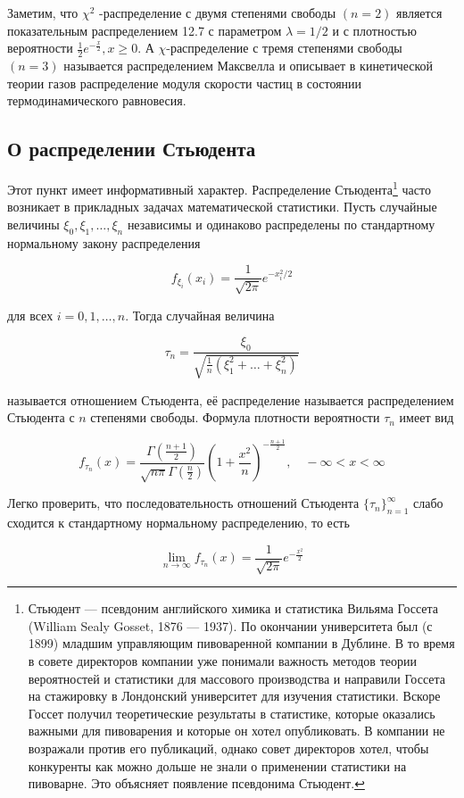  \begin{zam}
 \label{zam:27.7}
Заметим, что $\chi^2$ -распределение с двумя степенями
свободы $(n = 2)$ является показательным распределением 12.7 с параметром $\lambda = 1/2$ и с плотностью вероятности $\frac{1}{2}e^{-\frac{x}{2}}, x \geq 0$. А $\chi$-распределение с тремя степенями свободы $(n = 3)$ называется распределением Максвелла и описывает в кинетической теории газов распределение модуля скорости
частиц в состоянии термодинамического равновесия.
 \end{zam}

\subsection{О распределении Стьюдента}

\begin{zam}
\label{zam:27.8}
Этот пункт имеет информативный характер. Распределение Стьюдента\footnote{Стьюдент — псевдоним английского химика и статистика Вильяма Госсета (William Sealy Gosset, 1876
— 1937). По окончании университета был (с 1899) младшим управляющим пивоваренной компании в Дублине. В то время в совете директоров компании уже понимали важность методов
теории вероятностей и статистики для массового производства и направили Госсета на стажировку в
Лондонский университет для изучения статистики. Вскоре Госсет получил теоретические результаты в
статистике, которые оказались важными для пивоварения и которые он хотел опубликовать. В компании
не возражали против его публикаций, однако совет директоров хотел, чтобы конкуренты как можно
дольше не знали о применении статистики на пивоварне. Это объясняет появление псевдонима Стьюдент.} часто возникает в прикладных задачах математической статистики. Пусть случайные величины $\xi_0 , \xi_1 , \ldots , \xi_n$ независимы и одинаково распределены по стандартному нормальному закону распределения

$$f_{\xi_i} (x_i) = \frac{1}{\sqrt{2\pi}}e^{{-x^2_i/2}}$$

для всех $i = 0, 1, \ldots , n$. Тогда случайная величина

$$\tau_n = \frac{\xi_0}{\sqrt{\frac{1}{n}(\xi_1^2 + \ldots + \xi_n^2)}}$$

называется отношением Стьюдента, её распределение называется распределением Стьюдента с $n$ степенями свободы. Формула плотности вероятности $\tau_n$ имеет вид

$$f_{\tau_n}(x) = \frac{\Gamma(\frac{n+1}{2})}{\sqrt{n\pi}\Gamma(\frac{n}{2})} \left(1 + \frac{x^2}{n} \right)^{-\frac{n+1}{2}}, \quad -\infty < x < \infty$$
\end{zam} 

\begin{zam}
\label{zam:27.9}
Легко проверить, что последовательность отношений Стьюдента $\{ \tau_n\}^{\infty}_{n=1}$ слабо сходится к стандартному нормальному распределению, то есть

$$\lim\limits_{n \to \infty} f_{\tau_n}(x) = \frac{1}{\sqrt{2\pi}}e^{-\frac{x^2}{2}}$$
\end{zam} 